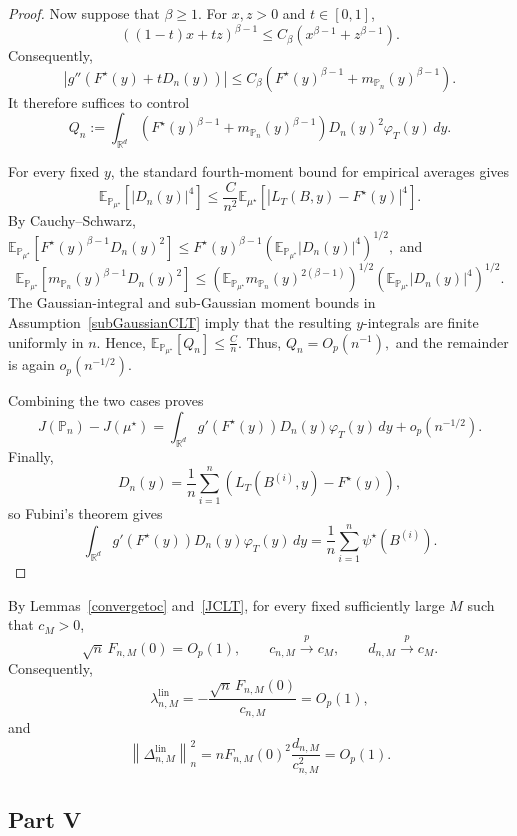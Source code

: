 \documentclass[11pt]{article}
\theoremstyle{definition}
\newcommand{\E}{\mathbb{E}}
\begin{document}
\begin{proof}
Now suppose that $\beta\geq1$. For $x,z>0$ and $t\in[0,1]$,
\[
\left(
(1-t)x+tz
\right)^{\beta-1}
\leq
C_\beta
\left(
x^{\beta-1}+z^{\beta-1}
\right).
\]
Consequently,
\[
\left|
g''\!\left(
F^\star(y)+tD_n(y)
\right)
\right|
\leq
C_\beta
\left(
F^\star(y)^{\beta-1}
+
m_{\mathbb P_n}(y)^{\beta-1}
\right).
\]
It therefore suffices to control
\[
Q_n
:=
\int_{\mathbb R^d}
\left(
F^\star(y)^{\beta-1}
+
m_{\mathbb P_n}(y)^{\beta-1}
\right)
D_n(y)^2
\varphi_T(y)\,dy.
\]

For every fixed $y$, the standard fourth-moment bound for empirical
averages gives
\[
\E_{\mathbb P_{\mu^\star}}
\left[
|D_n(y)|^4
\right]
\leq
\frac{C}{n^2}
\E_{\mu^\star}
\left[
\left|
L_T(B,y)-F^\star(y)
\right|^4
\right].
\]
By Cauchy--Schwarz, $\E_{\mathbb P_{\mu^\star}}
\left[
F^\star(y)^{\beta-1}
D_n(y)^2
\right] \leq
F^\star(y)^{\beta-1}
\left(
\E_{\mathbb P_{\mu^\star}}
|D_n(y)|^4
\right)^{1/2},$
and $$\E_{\mathbb P_{\mu^\star}}
\left[
m_{\mathbb P_n}(y)^{\beta-1}
D_n(y)^2
\right] \leq
\left(
\E_{\mathbb P_{\mu^\star}}
m_{\mathbb P_n}(y)^{2(\beta-1)}
\right)^{1/2}
\left(
\E_{\mathbb P_{\mu^\star}}
|D_n(y)|^4
\right)^{1/2}.$$
The Gaussian-integral and sub-Gaussian moment bounds in
Assumption~\ref{subGaussianCLT} imply that the resulting
$y$-integrals are finite uniformly in $n$. Hence, $\E_{\mathbb P_{\mu^\star}}[Q_n]
\leq
\frac{C}{n}.$
Thus, $Q_n=O_p(n^{-1}),$
and the remainder is again $o_p(n^{-1/2})$.

Combining the two cases proves
\[
J(\mathbb P_n)-J(\mu^\star)
=
\int_{\mathbb R^d}
g'\!\left(F^\star(y)\right)
D_n(y)
\varphi_T(y)\,dy
+
o_p(n^{-1/2}).
\]
Finally,
\[
D_n(y)
=
\frac1n
\sum_{i=1}^n
\left(
L_T(B^{(i)},y)-F^\star(y)
\right),
\]
so Fubini's theorem gives
\[
\int_{\mathbb R^d}
g'\!\left(F^\star(y)\right)
D_n(y)
\varphi_T(y)\,dy
=
\frac1n
\sum_{i=1}^n
\psi^\star(B^{(i)}).
\]
\end{proof}

By Lemmas~\ref{convergetoc} and~\ref{JCLT}, for every fixed
sufficiently large $M$ such that $c_M>0$,
\[
\sqrt n\,F_{n,M}(0)=O_p(1),
\qquad
c_{n,M}\xrightarrow{p}c_M,
\qquad
d_{n,M}\xrightarrow{p}c_M.
\]
Consequently,
\[
\lambda_{n,M}^{\mathrm{lin}}
=
-
\frac{\sqrt n\,F_{n,M}(0)}
{c_{n,M}}
=
O_p(1),
\]
and
\[
\left\|
\Delta_{n,M}^{\mathrm{lin}}
\right\|_n^2
=
nF_{n,M}(0)^2
\frac{d_{n,M}}{c_{n,M}^2}
=
O_p(1).
\]

\subsection{Part V}
\end{document}
